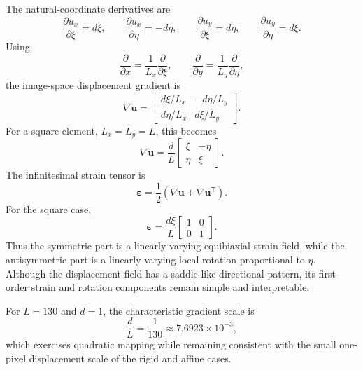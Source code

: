 \documentclass[11pt,a4paper]{article}
\newcommand{\vect}[1]{\bm{#1}}
\begin{document}
The natural-coordinate derivatives are
\begin{equation}
  \frac{\partial u_x}{\partial\xi}=d\xi,
  \qquad
  \frac{\partial u_x}{\partial\eta}=-d\eta,
  \qquad
  \frac{\partial u_y}{\partial\xi}=d\eta,
  \qquad
  \frac{\partial u_y}{\partial\eta}=d\xi.
\end{equation}
Using
\begin{equation}
  \frac{\partial}{\partial x}=\frac{1}{L_x}\frac{\partial}{\partial\xi},
  \qquad
  \frac{\partial}{\partial y}=\frac{1}{L_y}\frac{\partial}{\partial\eta},
\end{equation}
the image-space displacement gradient is
\begin{equation}
  \boxed{
  \nabla\vect{u}
  =
  \begin{bmatrix}
    d\xi/L_x & -d\eta/L_y\\[4pt]
    d\eta/L_x & d\xi/L_y
  \end{bmatrix}.}
\end{equation}
For a square element, $L_x=L_y=L$, this becomes
\begin{equation}
  \nabla\vect{u}
  =\frac{d}{L}
  \begin{bmatrix}
    \xi & -\eta\\
    \eta & \xi
  \end{bmatrix}.
\end{equation}
The infinitesimal strain tensor is
\begin{equation}
  \vect{\varepsilon}
  =\frac{1}{2}\left(\nabla\vect{u}+\nabla\vect{u}^{\mathsf T}\right).
\end{equation}
For the square case,
\begin{equation}
  \boxed{
  \vect{\varepsilon}
  =\frac{d\xi}{L}
  \begin{bmatrix}
    1&0\\
    0&1
  \end{bmatrix}.}
\end{equation}
Thus the symmetric part is a linearly varying equibiaxial strain field, while the antisymmetric part is a linearly varying local rotation proportional to $\eta$. Although the displacement field has a saddle-like directional pattern, its first-order strain and rotation components remain simple and interpretable.

For $L=130$ and $d=1$, the characteristic gradient scale is
\begin{equation}
  \frac{d}{L}=\frac{1}{130}\approx7.6923\times10^{-3},
\end{equation}
which exercises quadratic mapping while remaining consistent with the small
one-pixel displacement scale of the rigid and affine cases.
\end{document}
